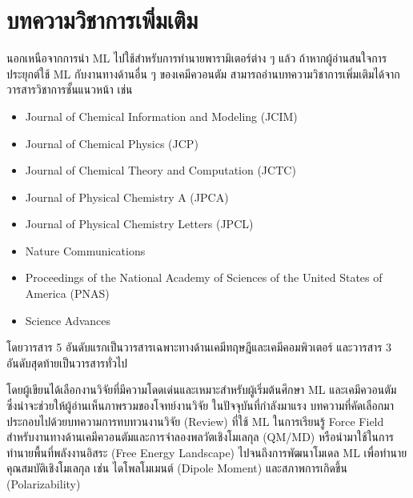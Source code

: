 
\section{บทความวิชาการเพิ่มเติม}
\label{sec:pred_misc_papers}

นอกเหนือจากการนำ ML ไปใช้สำหรับการทำนายพารามิเตอร์ต่าง ๆ แล้ว ถ้าหากผู้อ่านสนใจการประยุกต์ใช้ ML กับงานทางด้านอื่น ๆ ของเคมีควอนตัม 
สามารถอ่านบทความวิชาการเพิ่มเติมได้จากวารสารวิชาการชั้นแนวหน้า เช่น 

\begin{itemize}[topsep=0pt,noitemsep]
    \item Journal of Chemical Information and Modeling (JCIM) 
    
    \item Journal of Chemical Physics (JCP)
    
    \item Journal of Chemical Theory and Computation (JCTC)
    
    \item Journal of Physical Chemistry A (JPCA)
    
    \item Journal of Physical Chemistry Letters (JPCL)
    
    \item Nature Communications
    
    \item Proceedings of the National Academy of Sciences of the United States of America (PNAS)
    
    \item Science Advances
\end{itemize}

\noindent โดยวารสาร 5 อันดับแรกเป็นวารสารเฉพาะทางด้านเคมีทฤษฎีและเคมีคอมพิวเตอร์ และวารสาร 3 อันดับสุดท้ายเป็นวารสารทั่วไป

โดยผู้เขียนได้เลือกงานวิจัยที่มีความโดดเด่นและเหมาะสำหรับผู้เริ่มต้นศึกษา ML และเคมีควอนตัม ซึ่งน่าจะช่วยให้ผู้อ่านเห็นภาพรวมของโจทย์งานวิจัย%
ในปัจจุบันที่กำลังมาแรง บทความที่คัดเลือกมาประกอบไปด้วยบทความการทบทวนงานวิจัย (Review) ที่ใช้ ML ในการเรียนรู้ Force Field 
สำหรับงานทางด้านเคมีควอนตัมและการจําลองพลวัตเชิงโมเลกุล (QM/MD) หรือนำมาใช้ในการทำนายพื้นที่พลังงานอิสระ (Free Energy Landscape)
ไปจนถึงการพัฒนาโมเดล ML เพื่อทำนายคุณสมบัติเชิงโมเลกุล เช่น ไดโพลโมเมนต์ (Dipole Moment) และสภาพการเกิดขึ้น (Polarizability)

